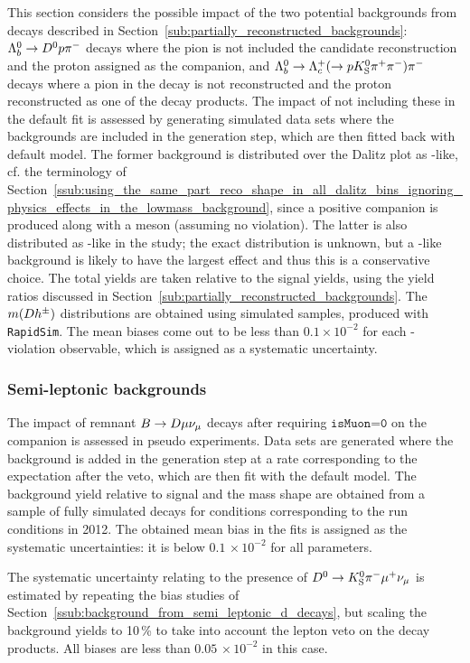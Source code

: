 This section considers the possible impact of the two potential backgrounds from \Lb decays described in Section~\ref{sub:partially_reconstructed_backgrounds}: ${{\Lambda}^0_{b}}\rightarrow{\ensuremath{{D}^0}} p{{\pi}^-}$  decays where the pion is not included the candidate reconstruction and the proton assigned as the companion, and ${{\Lambda}^0_{b}}\rightarrow{\ensuremath{{\Lambda}^+_{c}}}(\rightarrow p{{K}^0_{\mathrm{S}}} {{\pi}^+}{{\pi}^-}){{\pi}^-}$ decays  where a pion in the \Lc decay is not reconstructed and the proton reconstructed as one of the \D decay products. The impact of not including these in the default fit is assessed by generating simulated data sets where the backgrounds are included in the generation step, which are then fitted back with default model. The former background is distributed over the Dalitz plot as \Dzb-like, cf. the terminology of Section~\ref{ssub:using_the_same_part_reco_shape_in_all_dalitz_bins_ignoring_physics_effects_in_the_lowmass_background}, since a positive companion is produced along with a \Dz meson (assuming no \CP violation). The latter is also distributed as \Dzb-like in the study; the exact distribution is unknown, but a \Dzb-like background is likely to have the largest effect and thus this is a conservative choice. The total yields are taken relative to the signal yields, using the yield ratios discussed in Section~\ref{sub:partially_reconstructed_backgrounds}.
The $m({D} h^\pm)$ distributions are obtained using simulated samples, produced with \texttt{RapidSim}. The mean biases come out to be less than $0.1\times 10^{-2}$ for each \CP-violation observable, which is assigned as a systematic uncertainty.

\subsubsection{Semi-leptonic backgrounds} %
\label{ssub:semi_leptonic_backgrounds_systematic}

The impact of remnant ${B}\rightarrow{\ensuremath{D}} \mu \nu_\mu$ decays after requiring $\texttt{isMuon=0}$ on the companion is assessed in pseudo experiments. Data sets are generated where the background is added in the generation step at a rate corresponding to the expectation after the veto, which are then fit with the default model. The background yield relative to  signal and the mass shape are obtained from a sample of fully simulated decays for conditions corresponding to the run conditions in 2012. The obtained mean bias in the fits is assigned as the systematic uncertainties: it is below $0.1\,\times10^{-2}$ for all parameters.

The systematic uncertainty relating to the presence of ${{D}^0}\rightarrow{\ensuremath{{K}^0_{\mathrm{S}}}}{\ensuremath{{\pi}^-}}\mu^+\nu_\mu$ is estimated by repeating the bias studies of Section~\ref{ssub:background_from_semi_leptonic_d_decays}, but scaling the background yields to 10\,\% to take into account the lepton veto on the \D decay products. All biases are less than $0.05\,\times 10^{-2}$ in this case.


